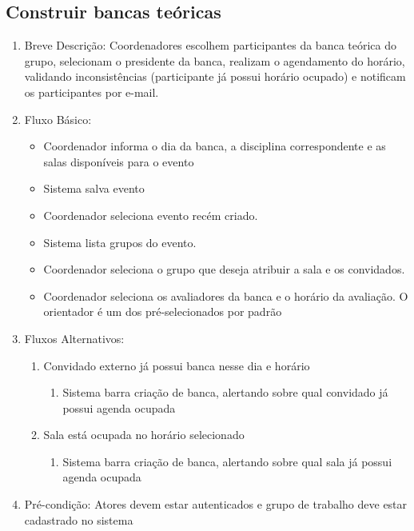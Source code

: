 \subsection{Construir bancas teóricas}
\begin{enumerate}
    \item Breve Descrição: Coordenadores escolhem participantes da banca teórica do grupo, selecionam o presidente da banca, realizam o agendamento do horário, validando inconsistências (participante já possui horário ocupado) e notificam os participantes por e-mail.
    \item Fluxo Básico:
    \begin{itemize}
        \item Coordenador informa o dia da banca, a disciplina correspondente e as salas disponíveis para o evento
        \item Sistema salva evento
        \item Coordenador seleciona evento recém criado.
        \item Sistema lista grupos do evento.
        \item Coordenador seleciona o grupo que deseja atribuir a sala e os convidados.
        \item Coordenador seleciona os avaliadores da banca e o horário da avaliação. O orientador é um dos pré-selecionados por padrão
    \end{itemize}
    \item Fluxos Alternativos:
    \begin{enumerate}
        \item Convidado externo já possui banca nesse dia e horário
        \begin{enumerate}
            \item Sistema barra criação de banca, alertando sobre qual convidado já possui agenda ocupada
        \end{enumerate}
        \item Sala está ocupada no horário selecionado
        \begin{enumerate}
            \item Sistema barra criação de banca, alertando sobre qual sala já possui agenda ocupada
        \end{enumerate}
    \end{enumerate}
    \item Pré-condição: Atores devem estar autenticados e grupo de trabalho deve estar cadastrado no sistema
\end{enumerate}

